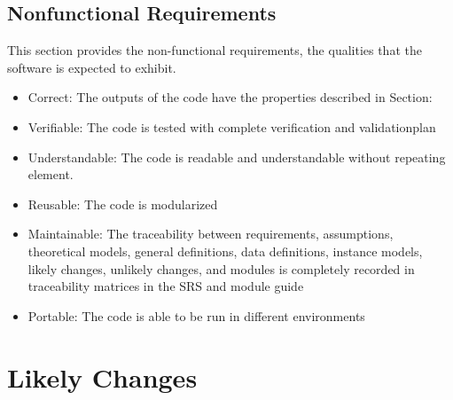\documentclass[12pt]{article}
\begin{document}
 

\subsection{Nonfunctional Requirements}

This section provides the non-functional requirements, the qualities that the
software is
expected to exhibit.

\noindent\begin{itemize}
\item[ ]Correct: The outputs of the code have the properties described in
Section: 
\item[ ]Verifiable: The code is tested with complete verification and
validationplan
\item[ ]Understandable: The code is readable and understandable without repeating element.
\item[ ]Reusable: The code is modularized
\item[ ]Maintainable: The traceability between requirements, assumptions,
theoretical models, general definitions, data definitions, instance models,
likely changes, unlikely changes, and modules
is completely recorded in traceability matrices in the SRS and module guide
\item[ ]Portable: The code is able to be run in different environments
\end{itemize}

\section{Likely Changes}    
\end{document}
